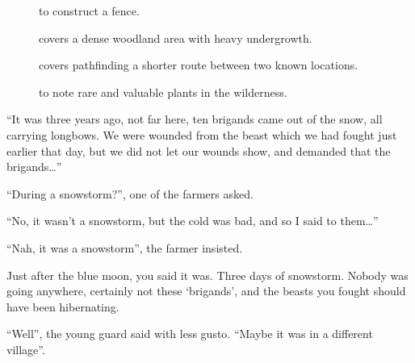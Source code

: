 \begin{multicols}{2}
\begin{description}
  \item[]
    to construct a fence.
  \item[]
    covers a dense woodland area with heavy undergrowth.
  \item[]
    covers pathfinding a shorter route between two known locations.
  \item[]
    to note rare and valuable plants in the wilderness.
\end{description}

\begin{exampletext}
  ``It was three years ago, not far here, ten brigands came out of the snow, all carrying longbows.
  We were wounded from the beast which we had fought just earlier that day, but we did not let our wounds show, and demanded that the brigands\ldots''

  ``During a snowstorm?'', one of the farmers asked.

  ``No, it wasn't a snowstorm, but the cold was bad, and so I said to them\ldots''

  ``Nah, it was a snowstorm'', the farmer insisted.

  Just after the blue moon, you said it was.
  Three days of snowstorm.
  Nobody was going anywhere, certainly not these `brigands', and the beasts you fought should have been hibernating.

  ``Well'', the young guard said with less gusto.
  ``Maybe it was in a different village''.

\end{exampletext}

\end{multicols}

\section{}
\label{fate_points}

